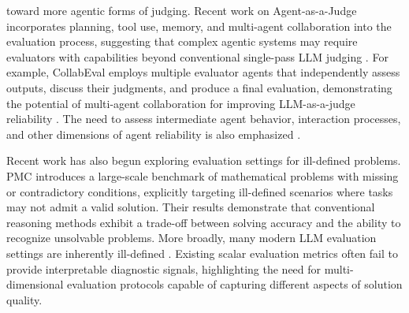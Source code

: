  toward more agentic forms of judging.
Recent work on Agent-as-a-Judge incorporates planning, tool use, memory, and multi-agent collaboration into the evaluation process, suggesting that complex agentic systems may require evaluators with capabilities beyond conventional single-pass LLM judging \cite{you2026agent}.
For example, CollabEval employs multiple evaluator agents that independently assess outputs, discuss their judgments, and produce a final evaluation, demonstrating the potential of multi-agent collaboration for improving LLM-as-a-judge reliability \cite{qian2026collabeval}.
The need to assess intermediate agent behavior, interaction processes, and other dimensions of agent reliability is also emphasized \cite{yehudai2026survey}.

Recent work has also begun exploring evaluation settings for ill-defined problems. PMC \cite{tian2025vcsearch} introduces a large-scale benchmark of mathematical problems with missing or contradictory conditions, explicitly targeting ill-defined scenarios where tasks may not admit a valid solution.
Their results demonstrate that conventional reasoning methods exhibit a trade-off between solving accuracy and the ability to recognize unsolvable problems.
More broadly, many modern LLM evaluation settings are inherently ill-defined \cite{zhou2026evaluating}.
Existing scalar evaluation metrics often fail to provide interpretable diagnostic signals, highlighting the need for multi-dimensional evaluation protocols capable of capturing different aspects of solution quality.